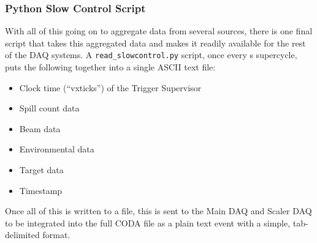 \subsubsection{Python Slow Control Script}

With all of this going on to aggregate data from several sources, there is one final script that takes this aggregated data and makes it readily available for the rest of the DAQ systems. A \verb|read_slowcontrol.py| script, once every \unit[60]{s} supercycle, puts the following together into a single ASCII text file:
\begin{itemize}
	\item Clock time (``vxticks'') of the Trigger Supervisor
	\item Spill count data
	\item Beam data
	\item Environmental data
	\item Target data
	\item Timestamp
\end{itemize}

Once all of this is written to a file, this is sent to the Main DAQ and Scaler DAQ to be integrated into the full CODA file as a plain text event with a simple, tab-delimited format.